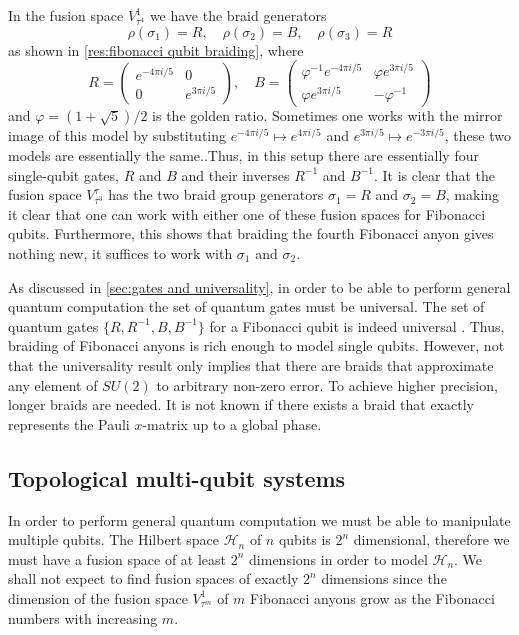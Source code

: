 \documentclass[a4paper,10pt,oneside]{book}
\theoremstyle{plain}
\theoremstyle{definition}
\theoremstyle{remark}
\begin{document}
In the fusion space $V_{τ^4}^1$ we have the braid generators
\begin{equation}
  ρ(σ_1) = R,\quad
  ρ(σ_2) = B,\quad
  ρ(σ_3) = R
\end{equation}
as shown in \cref{res:fibonacci qubit braiding}, where
\begin{equation}
  R =
  \begin{pmatrix}
    e^{-4πi/5} & 0 \\
    0 & e^{3πi/5}
  \end{pmatrix}, \quad
  B =
  \begin{pmatrix}
    φ^{-1}e^{-4πi/5} & φe^{3πi/5} \\
    φe^{3πi/5} & - φ^{-1}
  \end{pmatrix}
\end{equation}
and $φ = (1+\sqrt{5})/2$ is the golden ratio. Sometimes one works with the mirror image of this model by substituting $e^{-4πi/5} \mapsto e^{4πi/5}$ and $e^{3πi/5} \mapsto e^{-3πi/5}$, these two models are essentially the same..Thus, in this setup there are essentially four single-qubit gates, $R$ and $B$ and their inverses $R^{-1}$ and $B^{-1}$. It is clear that the fusion space $V_{τ^3}^τ$ has the two braid group generators $σ_1 = R$ and $σ_2 = B$, making it clear that one can work with either one of these fusion spaces for Fibonacci qubits. Furthermore, this shows that braiding the fourth Fibonacci anyon gives nothing new, it suffices to work with $σ_1$ and $σ_2$.

As discussed in \cref{sec:gates and universality}, in order to be able to perform general quantum computation the set of quantum gates must be universal. The set of quantum gates $\{R,R^{-1},B,B^{-1}\}$ for a Fibonacci qubit is indeed universal \cite{nayak,wang book,freedman kitaev larsen wang}. Thus, braiding of Fibonacci anyons is rich enough to model single qubits. However, not that the universality result only implies that there are braids that approximate any element of $SU(2)$ to arbitrary non-zero error. To achieve higher precision, longer braids are needed. It is not known if there exists a braid that exactly represents the Pauli $x$-matrix up to a global phase. \cite[sec. 1.5]{wang book}


\subsection{Topological multi-qubit systems}

In order to perform general quantum computation we must be able to manipulate multiple qubits. The Hilbert space $\mathcal{H}_n$ of $n$ qubits is $2^n$ dimensional, therefore we must have a fusion space of at least $2^n$ dimensions in order to model $\mathcal{H}_n$. We shall not expect to find fusion spaces of exactly $2^n$ dimensions since the dimension of the fusion space $V_{τ^m}^1$ of $m$ Fibonacci anyons grow as the Fibonacci numbers with increasing $m$.
\end{document}
